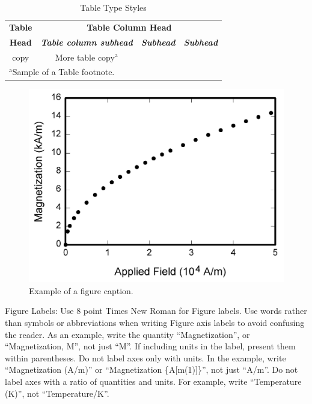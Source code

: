 \documentclass[conference]{IEEEtran}
\begin{document}
    \begin{table}[htbp]
    \caption{Table Type Styles}
    \begin{center}
    \begin{tabular}{|c|c|c|c|}
    \hline
    \textbf{Table}&\multicolumn{3}{|c|}{\textbf{Table Column Head}} \\
    \cline{2-4} 
    \textbf{Head} & \textbf{\textit{Table column subhead}}& \textbf{\textit{Subhead}}& \textbf{\textit{Subhead}} \\
    \hline
    copy& More table copy$^{\mathrm{a}}$& &  \\
    \hline
    \multicolumn{4}{l}{$^{\mathrm{a}}$Sample of a Table footnote.}
    \end{tabular}
    \label{tab1}
    \end{center}
    \end{table}

    \begin{figure}[htbp]
    \centerline{\includegraphics{fig1.png}}
    \caption{Example of a figure caption.}
    \label{fig}
    \end{figure}

    Figure Labels: Use 8 point Times New Roman for Figure labels. Use words 
    rather than symbols or abbreviations when writing Figure axis labels to 
    avoid confusing the reader. As an example, write the quantity 
    ``Magnetization'', or ``Magnetization, M'', not just ``M''. If including 
    units in the label, present them within parentheses. Do not label axes only 
    with units. In the example, write ``Magnetization (A/m)'' or ``Magnetization 
    \{A[m(1)]\}'', not just ``A/m''. Do not label axes with a ratio of 
    quantities and units. For example, write ``Temperature (K)'', not 
    ``Temperature/K''.
\end{document}
